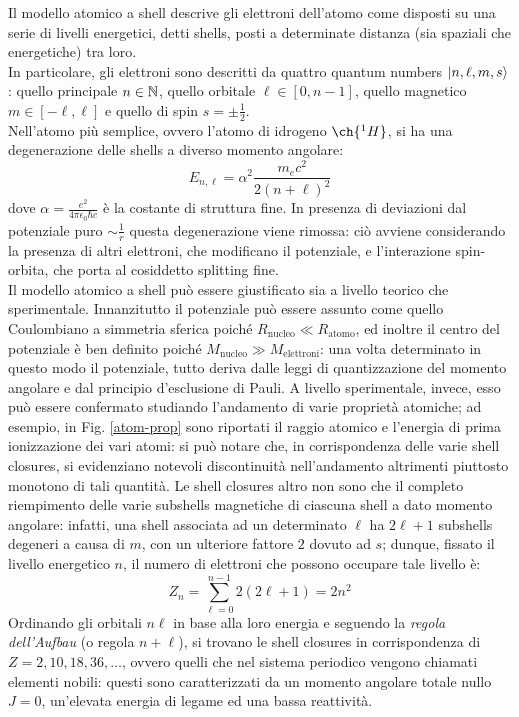 Il modello atomico a shell descrive gli elettroni dell'atomo come disposti su una serie di livelli energetici, detti shells, posti a determinate distanza (sia spaziali che energetiche) tra loro.\\
In particolare, gli elettroni sono descritti da quattro quantum numbers $ \ket{n,\ell,m,s} $: quello principale $ n \in \mathbb{N} $, quello orbitale $ \ell \in [0,n-1] $, quello magnetico $ m \in [-\ell,\ell] $ e quello di spin $ s = \pm \frac{1}{2} $.\\
Nell'atomo più semplice, ovvero l'atomo di idrogeno $ \ch{^1H} $, si ha una degenerazione delle shells a diverso momento angolare:
\begin{equation}
	E_{n,\ell} = \alpha^2 \frac{m_e c^2}{2 (n + \ell)^2}
	\label{eq:5.1}
\end{equation}
dove $ \alpha = \frac{e^2}{4\pi \epsilon_0 \hbar c} $ è la costante di struttura fine. In presenza di deviazioni dal potenziale puro $ \sim \frac{1}{r} $ questa degenerazione viene rimossa: ciò avviene considerando la presenza di altri elettroni, che modificano il potenziale, e l'interazione spin-orbita, che porta al cosiddetto splitting fine.\\
Il modello atomico a shell può essere giustificato sia a livello teorico che sperimentale. Innanzitutto il potenziale può essere assunto come quello Coulombiano a simmetria sferica poiché $ R_{\text{nucleo}} \ll R_{\text{atomo}} $, ed inoltre il centro del potenziale è ben definito poiché $ M_{\text{nucleo}} \gg M_{\text{elettroni}} $: una volta determinato in questo modo il potenziale, tutto deriva dalle leggi di quantizzazione del momento angolare e dal principio d'esclusione di Pauli. A livello sperimentale, invece, esso può essere confermato studiando l'andamento di varie proprietà atomiche; ad esempio, in Fig. \ref{atom-prop} sono riportati il raggio atomico e l'energia di prima ionizzazione dei vari atomi: si può notare che, in corrispondenza delle varie shell closures, si evidenziano notevoli discontinuità nell'andamento altrimenti piuttosto monotono di tali quantità. Le shell closures altro non sono che il completo riempimento delle varie subshells magnetiche di ciascuna shell a dato momento angolare: infatti, una shell associata ad un determinato $ \ell $ ha $ 2\ell + 1 $ subshells degeneri a causa di $ m $, con un ulteriore fattore $ 2 $ dovuto ad $ s $; dunque, fissato il livello energetico $ n $, il numero di elettroni che possono occupare tale livello è:
\begin{equation}
	Z_n = \sum_{\ell = 0}^{n - 1} 2(2\ell + 1) = 2n^2
	\label{eq:5.2}
\end{equation}
Ordinando gli orbitali $ n\ell $ in base alla loro energia e seguendo la \textit{regola dell'Aufbau} (o regola $ n + \ell $), si trovano le shell closures in corrispondenza di $ Z = 2,10,18,36,\dots $, ovvero quelli che nel sistema periodico vengono chiamati elementi nobili: questi sono caratterizzati da un momento angolare totale nullo $ J = 0 $, un'elevata energia di legame ed una bassa reattività.


